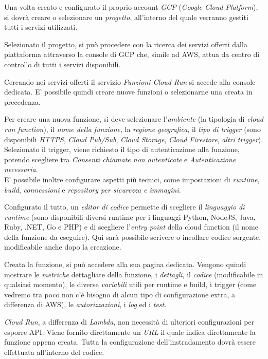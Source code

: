 Una volta creato e configurato il proprio account \textit{GCP} (\textit{Google Cloud Platform}), si dovrà creare o selezionare un \textit{progetto}, all'interno del quale verranno gestiti tutti i servizi utilizzati.

Selezionato il progetto, si può procedere con la ricerca dei servizi offerti dalla piattaforma attraverso la console di GCP che, simile ad AWS, attua da centro di controllo di tutti i servizi disponibili.

Cercando nei servizi offerti il servizio \textit{Funzioni Cloud Run} si accede alla console dedicata. E' possibile quindi creare nuove funzioni o selezionarne una creata in precedenza.

Per creare una nuova funzione, si deve selezionare l'\textit{ambiente} (la tipologia di \textit{cloud run function}), il \textit{nome della funzione}, la \textit{regione geografica}, il \textit{tipo di trigger} (sono disponibili \textit{HTTPS}, \textit{Cloud Pub/Sub}, \textit{Cloud Storage}, \textit{Cloud Firestore}, \textit{altri trigger}). Selezionato il trigger, viene richiesto il tipo di autenticazione alla funzione, potendo scegliere tra \textit{Consenti chiamate non autenticate} e \textit{Autenticazione necessaria}.\\
E' possibile inoltre configurare aspetti più tecnici, come impostazioni di \textit{runtime}, \textit{build}, \textit{connessioni} e \textit{repository per sicurezza e immagini}.

Configurato il tutto, un \textit{editor di codice} permette di scegliere il \textit{linguaggio di runtime} (sono disponibili diversi runtime per i linguaggi Python, NodeJS, Java, Ruby, .NET, Go e PHP) e di scegliere l'\textit{entry point} della cloud function (il nome della funzione da eseguire). Qui sarà possibile scrivere o incollare codice sorgente, modificabile anche dopo la creazione.

Creata la funzione, si può accedere alla sua pagina dedicata. Vengono quindi mostrare le \textit{metriche} dettagliate della funzione, i \textit{dettagli}, il \textit{codice} (modificabile in qualsiasi momento), le diverse \textit{variabili} utili per runtime e build, i trigger (come vedremo tra poco non c'è bisogno di alcun tipo di configurazione extra, a differenza di AWS), le \textit{autorizzazioni}, i \textit{log} ed i \textit{test}. 

\textit{Cloud Run}, a differenza di \textit{Lambda}, non necessità di ulteriori configurazioni per esporre API. Viene fornito direttamente un \textit{URL} il quale indica direttamente la funzione appena creata. Tutta la configurazione dell'instradamento dovrà essere effettuata all'interno del codice.
